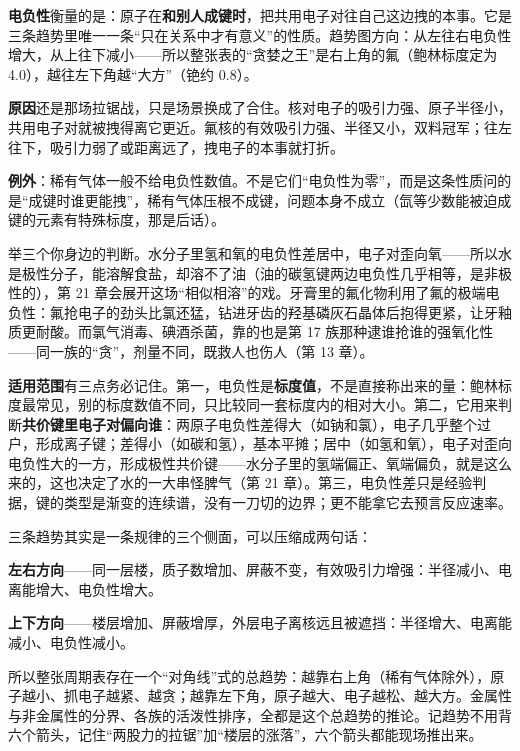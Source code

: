 \textbf{电负性}衡量的是：原子在\textbf{和别人成键时}，把共用电子对往自己这边拽的本事。它是三条趋势里唯一一条“只在关系中才有意义”的性质。趋势图方向：从左往右电负性增大，从上往下减小——所以整张表的“贪婪之王”是右上角的氟（鲍林标度定为 4.0），越往左下角越“大方”（铯约 0.8）。

\textbf{原因}还是那场拉锯战，只是场景换成了合住。核对电子的吸引力强、原子半径小，共用电子对就被拽得离它更近。氟核的有效吸引力强、半径又小，双料冠军；往左往下，吸引力弱了或距离远了，拽电子的本事就打折。

\textbf{例外}：稀有气体一般不给电负性数值。不是它们“电负性为零”，而是这条性质问的是“成键时谁更能拽”，稀有气体压根不成键，问题本身不成立（氙等少数能被迫成键的元素有特殊标度，那是后话）。

举三个你身边的判断。水分子里氢和氧的电负性差居中，电子对歪向氧——所以水是极性分子，能溶解食盐，却溶不了油（油的碳氢键两边电负性几乎相等，是非极性的），第 21 章会展开这场“相似相溶”的戏。牙膏里的氟化物利用了氟的极端电负性：氟抢电子的劲头比氯还猛，钻进牙齿的羟基磷灰石晶体后抱得更紧，让牙釉质更耐酸。而氯气消毒、碘酒杀菌，靠的也是第 17 族那种逮谁抢谁的强氧化性——同一族的“贪”，剂量不同，既救人也伤人（第 13 章）。

\textbf{适用范围}有三点务必记住。第一，电负性是\textbf{标度值}，不是直接称出来的量：鲍林标度最常见，别的标度数值不同，只比较同一套标度内的相对大小。第二，它用来判断\textbf{共价键里电子对偏向谁}：两原子电负性差得大（如钠和氯），电子几乎整个过户，形成离子键；差得小（如碳和氢），基本平摊；居中（如氢和氧），电子对歪向电负性大的一方，形成极性共价键——水分子里的氢端偏正、氧端偏负，就是这么来的，这也决定了水的一大串怪脾气（第 21 章）。第三，电负性差只是经验判据，键的类型是渐变的连续谱，没有一刀切的边界；更不能拿它去预言反应速率。

\begin{qiaoliang}
三条趋势其实是一条规律的三个侧面，可以压缩成两句话：

\textbf{左右方向}——同一层楼，质子数增加、屏蔽不变，有效吸引力增强：半径减小、电离能增大、电负性增大。

\textbf{上下方向}——楼层增加、屏蔽增厚，外层电子离核远且被遮挡：半径增大、电离能减小、电负性减小。

所以整张周期表存在一个“对角线”式的总趋势：越靠右上角（稀有气体除外），原子越小、抓电子越紧、越贪；越靠左下角，原子越大、电子越松、越大方。金属性与非金属性的分界、各族的活泼性排序，全都是这个总趋势的推论。记趋势不用背六个箭头，记住“两股力的拉锯”加“楼层的涨落”，六个箭头都能现场推出来。
\end{qiaoliang}

